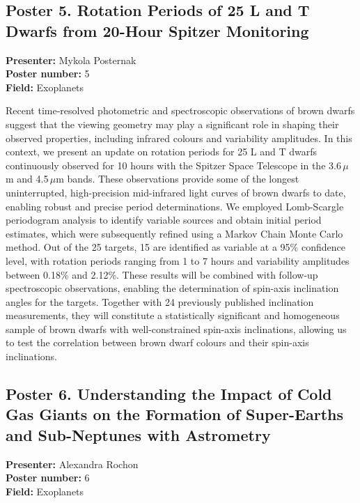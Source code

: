 \hypertarget{poster-abstract-talk-88}{}\label{poster-abstract-page-talk-88}
\subsection*{Poster 5. Rotation Periods of 25 L and T Dwarfs from 20-Hour Spitzer Monitoring}
\textbf{Presenter:} Mykola Posternak\\
\textbf{Poster number:} 5\\
\textbf{Field:} Exoplanets

Recent time-resolved photometric and spectroscopic observations of brown dwarfs suggest that the viewing geometry may play a significant role in shaping their observed properties, including infrared colours and variability amplitudes. In this context, we present an update on rotation periods for 25 L and T dwarfs continuously observed for 10 hours with the Spitzer Space Telescope in the 3.6\,$\mu$m and 4.5\,$\mu$m bands. These observations provide some of the longest uninterrupted, high-precision mid-infrared light curves of brown dwarfs to date, enabling robust and precise period determinations. We employed Lomb-Scargle periodogram analysis to identify variable sources and obtain initial period estimates, which were subsequently refined using a Markov Chain Monte Carlo method. Out of the 25 targets, 15 are identified as variable at a 95\% confidence level, with rotation periods ranging from 1 to 7 hours and variability amplitudes between 0.18\% and 2.12\%. These results will be combined with follow-up spectroscopic observations, enabling the determination of spin-axis inclination angles for the targets. Together with 24 previously published inclination measurements, they will constitute a statistically significant and homogeneous sample of brown dwarfs with well-constrained spin-axis inclinations, allowing us to test the correlation between brown dwarf colours and their spin-axis inclinations.

\hypertarget{poster-abstract-talk-253}{}\label{poster-abstract-page-talk-253}
\subsection*{Poster 6. Understanding the Impact of Cold Gas Giants on the Formation of Super-Earths and Sub-Neptunes with Astrometry}
\textbf{Presenter:} Alexandra Rochon\\
\textbf{Poster number:} 6\\
\textbf{Field:} Exoplanets

